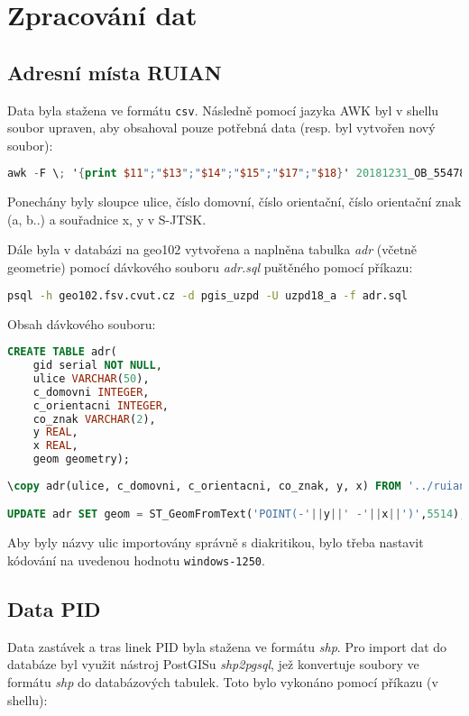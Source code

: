 \documentclass[a4paper, 12pt]{article}
\begin{document}
\newpage
\section{Zpracování dat}
\subsection{Adresní místa RUIAN}
Data byla stažena ve formátu \texttt{csv}. Následně pomocí jazyka AWK byl v shellu soubor upraven, aby obsahoval pouze potřebná data (resp. byl vytvořen nový soubor):
\begin{lstlisting}[language=awk]
awk -F \; '{print $11";"$13";"$14";"$15";"$17";"$18}' 20181231_OB_554782_ADR.csv > ruian_adr.csv
\end{lstlisting}

Ponechány byly sloupce ulice, číslo domovní, číslo orientační, číslo orientační znak (a, b..) a souřadnice x, y v S-JTSK. 

Dále byla v databázi na geo102 vytvořena a naplněna tabulka \textit{adr} (včetně geometrie) pomocí dávkového souboru \textit{adr.sql} puštěného pomocí příkazu:

\begin{lstlisting}[language=bash]
psql -h geo102.fsv.cvut.cz -d pgis_uzpd -U uzpd18_a -f adr.sql	
\end{lstlisting}

Obsah dávkového souboru:

\begin{lstlisting}[language=sql]
CREATE TABLE adr(
	gid serial NOT NULL,
	ulice VARCHAR(50),
	c_domovni INTEGER,
	c_orientacni INTEGER,
	co_znak VARCHAR(2),
	y REAL,
	x REAL,
	geom geometry);
	
\copy adr(ulice, c_domovni, c_orientacni, co_znak, y, x) FROM '../ruian_adr.csv' DELIMITER ';' CSV HEADER encoding 'windows-1250';

UPDATE adr SET geom = ST_GeomFromText('POINT(-'||y||' -'||x||')',5514);
\end{lstlisting}

Aby byly názvy ulic importovány správně s diakritikou, bylo třeba nastavit kódování na uvedenou hodnotu \texttt{windows-1250}.

\subsection{Data PID}
Data zastávek a tras linek PID byla stažena ve formátu \textit{shp}. Pro import dat do databáze byl využit nástroj PostGISu \textit{shp2pgsql}, jež konvertuje soubory ve formátu \textit{shp} do databázových tabulek. Toto bylo vykonáno pomocí příkazu (v shellu):
\end{document}
